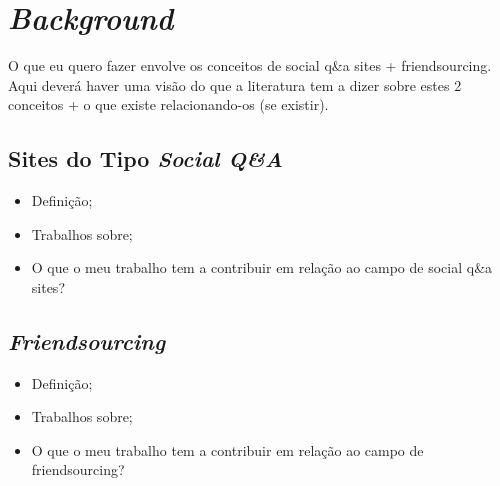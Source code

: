 \chapter{\textit{Background}}
O que eu quero fazer envolve os conceitos de social q\&a sites + friendsourcing. Aqui deverá haver uma visão do que a literatura tem a dizer sobre estes 2 conceitos + o que existe relacionando-os (se existir). 

\section{Sites do Tipo \textit{Social Q\&A}}
\begin{itemize}
  \item Definição;
  \item Trabalhos sobre;
  \item O que o meu trabalho tem a contribuir em relação ao campo de social q\&a sites?
\end{itemize}
\section{\textit{Friendsourcing}}
\begin{itemize}
  \item Definição;
  \item Trabalhos sobre;
  \item O que o meu trabalho tem a contribuir em relação ao campo de friendsourcing?
\end{itemize}